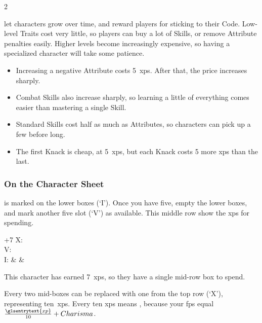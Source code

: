 \begin{multicols}{2}

\noindent
{} let characters grow over time, and reward players for sticking to their Code.
Low-level Traits cost very little, so players can buy a lot of Skills, or remove Attribute penalties easily.
Higher levels become increasingly expensive, so having a specialized character will take some patience.

\begin{itemize}
  \item
  Increasing a negative Attribute costs 5~\glspl{xp}.
  After that, the price increases sharply.
  \item
  Combat Skills also increase sharply, so learning a little of everything comes easier than mastering a single Skill.
  \item
  Standard Skills cost half as much as Attributes, so characters can pick up a few before long.
  \item
  The first Knack is cheap, at 5~\glspl{xp}, but each Knack costs 5 more \glspl{xp} than the last.
\end{itemize}

\subsubsection{On the Character Sheet}
 is marked on the lower boxes (`I').
Once you have five, empty the lower boxes, and mark another five slot (`V') as available.
This middle row show the \glspl{xp} for spending.

\begin{nametable}[rcccccccccc]{+7 }
  X: 
  \\
  V: %
  \\
  I: &   & \Circle
  \\
\end{nametable}

\begin{exampletext}
  This character has earned 7~\glspl{xp}, so they have a single mid-row box to spend.
\end{exampletext}

Every two mid-boxes can be replaced with one from the top row (`X'), representing ten~\glspl{xp}.
Every ten \glspl{xp} means , because your \glspl{fp} equal $\frac{\glsentrytext{xp}}{10} + Charisma$.


\end{multicols}
